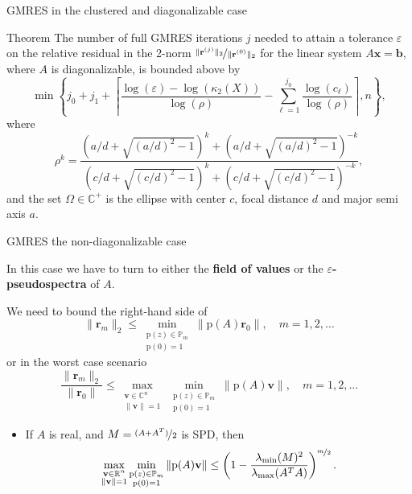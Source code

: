 \documentclass[aspectratio=169,xcolor=dvipsnames]{beamer}
\begin{document}
\begin{frame}{GMRES in the clustered and diagonalizable case}
\begin{alertblock}{Theorem}
The number of full GMRES iterations $j$ needed to attain a tolerance
$\varepsilon$ on the relative residual in the 2-norm
$\nicefrac{\|\mathbf{r}^{(j)}\|_2}{\|\mathbf{r}^{(0)}\|_2}$ for the linear system $A \mathbf{x} =\mathbf{b}$, where $A$ is
diagonalizable, is bounded above by
\begin{equation*}
	\min \left\{j_0+ j_1 + \left\lceil
	\frac{\log(\varepsilon)-\log(\kappa_2(X))}{\log(\rho)}-
	\sum_{\ell=1}^{j_0} \frac{\log(c_{\ell})}{\log(\rho)} \right\rceil,
	n\right\}, \label{bound-it-eig}
\end{equation*}
where
\begin{equation*}
	\rho^k=\frac{\left(a/d+\sqrt{(a/d)^2-1}\right)^k+\left(a/d+\sqrt{(a/d)^2-1}\right)^{-k}}
	{\left(c/d+\sqrt{(c/d)^2-1}\right)^k+\left(c/d+\sqrt{(c/d)^2-1}\right)^{-k}},
	\label{eq:ellipse-rho}
\end{equation*}
and the set $\Omega\in\mathbb{C}^+$ is the ellipse with center $c$,
focal distance $d$ and major semi axis $a$.
\end{alertblock}
\end{frame}

\begin{frame}{GMRES the non-diagonalizable case}

In this case we have to turn to either the \textbf{field of values} or the \textbf{$\varepsilon$-pseudospectra} of $A$.

We need to bound the right-hand side of
\[
\|\mathbf{r}_m\|_2\leq 
\min_{\substack{\mathrm{p}(z)\in\mathbb{P}_m\\\mathrm{p}(0)=1}} \|\mathrm{p}(A)\mathbf{r}_0\|, \quad m=1,2,\ldots
\]
or in the \alert{worst case scenario}
\[
\frac{\|\mathbf{r}_m\|_2}{\|\mathbf{r}_0\|} \leq \max_{\substack{\mathbf{v} \in \mathbb{C}^n\\\|\mathbf{v}\|=1}} \min_{\substack{\mathrm{p}(z)\in\mathbb{P}_m\\\mathrm{p}(0)=1}} \|\mathrm{p}(A)\mathbf{v}\| , \quad m=1,2,\ldots
\]
\begin{itemize}
	\item[\faCog] If $A$ is real, and $M = \nicefrac{(A+A^T)}{2}$ is SPD, then \parencite{MR694523}
	\[
	\max_{\substack{\mathbf{v} \in \mathbb{R}^n\\\|\mathbf{v}\|=1}} \min_{\substack{\mathrm{p}(z)\in\mathbb{P}_m\\\mathrm{p}(0)=1}} \|\mathrm{p}(A)\mathbf{v}\| \leq \left(1 - \frac{\lambda_{\min}(M)^2}{\lambda_{\max}(A^TA)}\right)^{\nicefrac{m}{2}}.
	\]
\end{itemize}
\end{frame}
\end{document}

